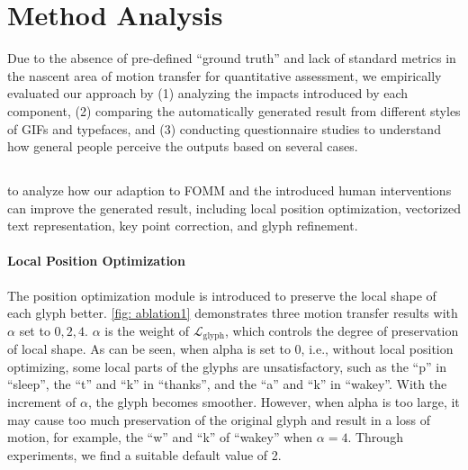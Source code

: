 \section{Method Analysis}
\label{sec:crowd}
Due to the absence of pre-defined ``ground truth'' and lack of standard metrics in the nascent area of motion transfer for quantitative assessment, we empirically evaluated our approach by (1) analyzing the impacts introduced by each component, (2) comparing the automatically generated result from different styles of GIFs and typefaces, and (3) conducting questionnaire studies to understand how general people perceive the outputs based on several cases.


\subsection{}
\label{sec:ablation}
 to analyze how our adaption to FOMM and the introduced human interventions can improve the generated result, including local position optimization, vectorized text representation, key point correction, and glyph refinement.

% 

\paragraph{Local Position Optimization}
The position optimization module is introduced to preserve the local shape of each glyph better.
\autoref{fig: ablation1} demonstrates three motion transfer results with $\alpha$ set to $0, 2, 4$. 
$\alpha$ is the weight of $\mathcal{L}_{\text{glyph}}$, which controls the degree of preservation of local shape. As can be seen, when alpha is set to 0, i.e., without local position optimizing, some local parts of the glyphs are unsatisfactory, such as the ``p'' in ``sleep'', the ``t'' and ``k'' in ``thanks'', and the ``a'' and ``k'' in ``wakey''.
With the increment of $\alpha$, the glyph becomes smoother. However, when alpha is too large, it may cause too much preservation of the original glyph and result in a loss of motion, for example, the ``w'' and ``k'' of ``wakey'' when $\alpha = 4$. Through experiments, we find a suitable default value of 2.


